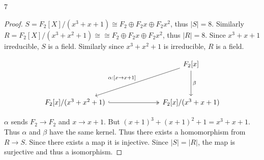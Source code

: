 \documentclass{article}
\begin{document}
\bigskip

\begin{PROB}{7}\label{Problem 7.}
\end{PROB}
\begin{proof}
    $S = F_2[X] / (x^3 + x + 1) \cong F_2 \oplus F_2x \oplus F_2 x^2$, thus $|S| = 8$. Similarly $R = F_2[X] / (x^3 + x^2 + 1) \cong \cong F_2 \oplus F_2x \oplus F_2 x^2$, thus $|R| = 8$. Since $x^3 + x + 1$ irreducible, $S$ is a field. Similarly since $x^3 + x^2 + 1$ is irreducible, $R$ is a field.
    
    
    \[\begin{tikzcd}
        &&& {F_2[x]} \\
        \\
        {F_2[x]/(x^3+x^2+1)} &&& {F_2[x]/(x^3 + x + 1)}
        \arrow["{\alpha: [x \to x+1]}"', from=1-4, to=3-1]
        \arrow[hook, two heads, from=3-1, to=3-4]
        \arrow["{\beta}" ,from=1-4, to=3-4]
    \end{tikzcd}\]

    $\alpha$ sends $F_2 \to F_2$ and $x \to x + 1$. But $(x+1)^3 + (x + 1)^2 + 1 = x^3 + x + 1$. Thus $\alpha$ and $\beta$ have the same kernel. Thus there exists a homomorphism from $R \to S$. Since there exists a map it is injective. Since $|S| = |R|$, the map is surjective and thus a isomorphism.         
\end{proof}

\bigskip
\end{document}
